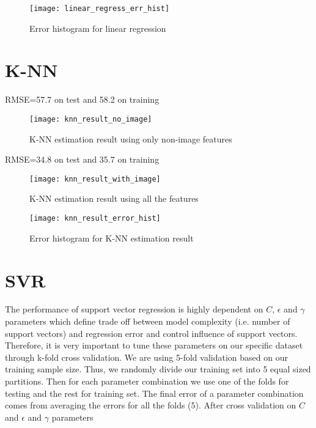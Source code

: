 \begin{figure}[h]
\caption{Error histogram for linear regression}
\label{fig:ln_result_all}
\texttt{[image: linear\_regress\_err\_hist]}
\centering
\end{figure}

\section{K-NN}

RMSE=57.7 on test and 58.2 on training

\begin{figure}[h]
\caption{K-NN estimation result using only non-image features}
\label{fig:knn_result_no_image}
\texttt{[image: knn\_result\_no\_image]}
\centering
\end{figure}

RMSE=34.8 on test and 35.7 on training

\begin{figure}[h]
\caption{K-NN estimation result using all the features}
\label{fig:knn_result_all}
\texttt{[image: knn\_result\_with\_image]}
\centering
\end{figure}

\begin{figure}[h]
\caption{Error histogram for K-NN estimation result}
\label{fig:err_hist_knn}
\texttt{[image: knn\_result\_error\_hist]}
\centering
\end{figure}

\section{SVR}
The performance of support vector regression is highly dependent on $C$, $\epsilon$ and $\gamma$ parameters which define trade off between model complexity (i.e. number of support vectors) and regression error and control influence of support vectors. Therefore, it is very important to tune these parameters on our specific dataset through k-fold cross validation. We are using 5-fold validation based on our training sample size. Thus, we randomly divide our training set into 5 equal sized partitions. Then for each parameter combination we use one of the folds for testing and the rest for training set. The final error of a parameter combination comes from averaging the errors for all the folds (5). After cross validation on $C$ and $\epsilon$  and $\gamma$ parameters


